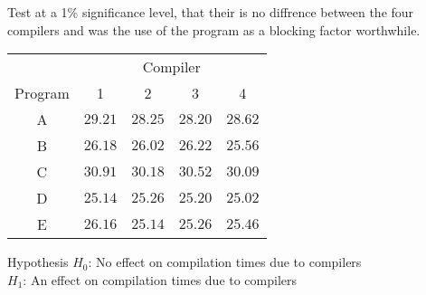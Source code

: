         \begin{example}
        {
            Test at a 1\% significance level, that their is no diffrence between the four compilers and was the use of the program as a blocking factor worthwhile.

            \begin{center}
            \begin{tabular}{c|c|c|c|c}
            & \multicolumn{4}{c}{Compiler} \\
            Program & 1         & 2         & 3         & 4         \\
            \hline
            A       & $29.21$   & $28.25$   & $28.20$   & $28.62$   \\
            B       & $26.18$   & $26.02$   & $26.22$   & $25.56$   \\
            C       & $30.91$   & $30.18$   & $30.52$   & $30.09$   \\
            D       & $25.14$   & $25.26$   & $25.20$   & $25.02$   \\
            E       & $26.16$   & $25.14$   & $25.26$   & $25.46$   \\
            \end{tabular}
            \end{center}
        }

        \begin{step}{Hypothesis}
        $H_0$: No effect on compilation times due to compilers\\
        $H_1$: An effect on compilation times due to compilers\\
        \end{step}


\end{example}
